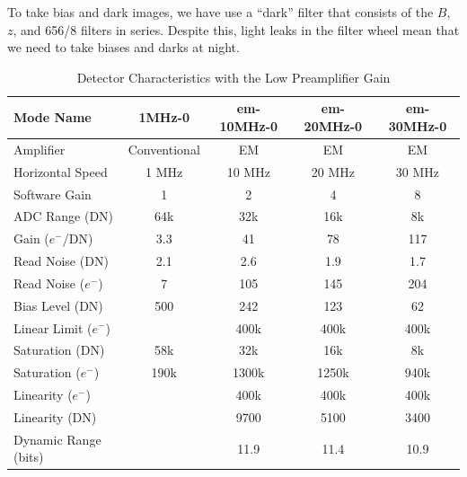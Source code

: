 To take bias and dark images, we have use a “dark” filter that consists of the $B$, $z$, and 656/8 filters in series. Despite this, light leaks in the filter wheel mean that we need to take biases and darks at night.

\begin{table}
    \centering
    \begin{tabular}{lcccc}
    \hline
    Mode Name&1MHz-0&em-10MHz-0&em-20MHz-0&em-30MHz-0\\
    \hline
    Amplifier&Conventional&EM&EM&EM\\
    Horizontal Speed&1 MHz&10 MHz&20 MHz&30 MHz\\
    Software Gain&1&2&4&8\\
    ADC Range (DN)&64k&32k&16k&8k\\
    Gain ($e^-$/DN)&3.3&41&78&117\\
    Read Noise (DN)&2.1&2.6&1.9&1.7\\
    Read Noise ($e^-$)&7&105&145&204\\
    Bias Level (DN)&500&242&123&62\\
    Linear Limit ($e^-$)&&400k&400k&400k\\
    Saturation (DN)&58k&32k&16k&8k\\
    Saturation ($e^-$)&190k&1300k&1250k&940k\\
    Linearity ($e^-$)&&400k&400k&400k\\
    Linearity (DN)&&9700&5100&3400\\
    Dynamic Range (bits)&&11.9&11.4&10.9\\
    \hline
    \end{tabular}
    \caption{Detector Characteristics with the Low Preamplifier Gain}
    \label{table:detector-characteristics-low-gain}
\end{table}

